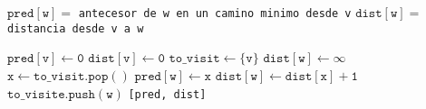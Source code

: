 \begin{algorithmic}
  \State $\mathtt{pred[w] =}$ \texttt{antecesor de w en un camino minimo desde v}
  \State $\mathtt{dist[w] =}$ \texttt{distancia desde v a w}

  \State $\mathtt{pred[v]\gets 0}$
  \State $\mathtt{dist[v]\gets 0}$
  \State $\mathtt{to\_visit \gets \{v\}}$
  \State $\mathtt{dist[w] \gets \infty}$
  \EndFor
  \State $\mathtt{x \gets to\_visit.pop()}$
  \State $\mathtt{pred[w] \gets x}$
  \State $\mathtt{dist[w] \gets dist[x] + 1}$
  \State $\mathtt{to\_visite.push(w)}$
  \EndFor
  \EndWhile
  \State\Return \texttt{[pred, dist]}
  \EndProcedure
\end{algorithmic}

